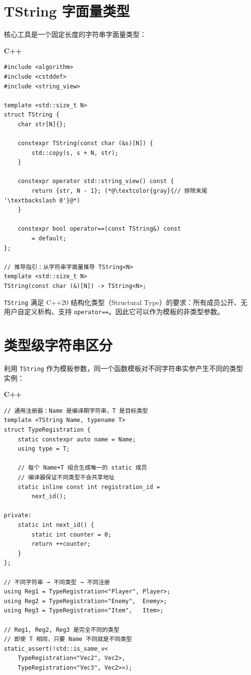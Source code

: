 \documentclass[12pt,a4paper,fontset=fandol]{ctexbook}
\newcommand{\Tp}[1]{\texttt{#1}}
\newcommand{\cpplabel}{%
  \noindent\begin{tcolorbox}[colback=algheadbg,coltext=white,
    sharp corners,boxrule=0pt,width=3.0em,height=1.4em,
    halign=center,valign=center,nobeforeafter,left=0pt,right=0pt,
    top=0pt,bottom=0pt]\small\bfseries C++\end{tcolorbox}}
\begin{document}
\section{TString 字面量类型}\label{sec:tstring}

核心工具是一个固定长度的字符串字面量类型：

\cpplabel
\begin{lstlisting}[style=cppstyle]
#include <algorithm>
#include <cstddef>
#include <string_view>

template <std::size_t N>
struct TString {
    char str[N]{};

    constexpr TString(const char (&s)[N]) {
        std::copy(s, s + N, str);
    }

    constexpr operator std::string_view() const {
        return {str, N - 1}; (*@\textcolor{gray}{// 排除末尾 '\textbackslash 0'}@*)
    }

    constexpr bool operator==(const TString&) const
        = default;
};

// 推导指引：从字符串字面量推导 TString<N>
template <std::size_t N>
TString(const char (&)[N]) -> TString<N>;
\end{lstlisting}

\Tp{TString} 满足 C++20 结构化类型（Structural Type）的要求：所有成员公开、无用户自定义析构、支持 \Tp{operator==}。因此它可以作为模板的非类型参数。

\section{类型级字符串区分}\label{sec:type-discrim}

利用 \Tp{TString} 作为模板参数，同一个函数模板对不同字符串实参产生不同的类型实例：

\cpplabel
\begin{lstlisting}[style=cppstyle]
// 通用注册器：Name 是编译期字符串，T 是目标类型
template <TString Name, typename T>
struct TypeRegistration {
    static constexpr auto name = Name;
    using type = T;

    // 每个 Name+T 组合生成唯一的 static 成员
    // 编译器保证不同类型不会共享地址
    static inline const int registration_id =
        next_id();

private:
    static int next_id() {
        static int counter = 0;
        return ++counter;
    }
};

// 不同字符串 → 不同类型 → 不同注册
using Reg1 = TypeRegistration<"Player", Player>;
using Reg2 = TypeRegistration<"Enemy",  Enemy>;
using Reg3 = TypeRegistration<"Item",   Item>;

// Reg1, Reg2, Reg3 是完全不同的类型
// 即使 T 相同，只要 Name 不同就是不同类型
static_assert(!std::is_same_v<
    TypeRegistration<"Vec2", Vec2>,
    TypeRegistration<"Vec3", Vec2>>);
\end{lstlisting}
\end{document}
